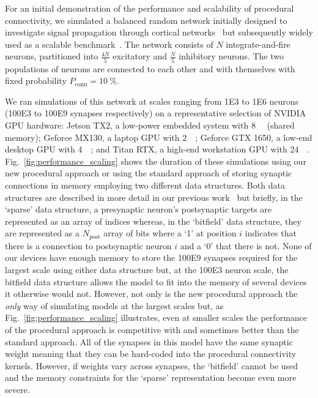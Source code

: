 \documentclass[9pt,a4paper]{amsart}
\begin{document}
For an initial demonstration of the performance and scalability of procedural connectivity, we simulated a balanced random network initially designed to investigate signal propagation through cortical networks~\citep{Vogels2005} but subsequently widely used as a scalable benchmark~\citep{Brette2007}.
The network consists of $N$ integrate-and-fire neurons, partitioned into $\frac{4N}{5}$ excitatory and $\frac{N}{5}$ inhibitory neurons.
The two populations of neurons are connected to each other and with themselves with fixed probability $P_{\text{conn}}=\SI{10}{\percent}$.

We ran simulations of this network at scales ranging from \num{1E3} to \num{1E6} neurons (\num{100E3} to \num{100E9} synapses respectively) on a representative selection of NVIDIA GPU hardware:
Jetson TX2, a low-power embedded system with \SI{8}{\giga\byte} (shared memory);
Geforce MX130, a laptop GPU with \SI{2}{\giga\byte};
Geforce GTX 1650, a low-end desktop GPU with \SI{4}{\giga\byte};
and Titan RTX, a high-end workstation GPU with \SI{24}{\giga\byte}.
Fig.~\ref{fig:performance_scaling} shows the duration of these simulations using our new procedural approach or using the standard approach of storing synaptic connections in memory employing two different data structures.
Both data structures are described in more detail in our previous work~\citep{Knight2018} but briefly, in the `sparse' data structure, a presynaptic neuron's postsynaptic targets are represented as an array of indices whereas, in the `bitfield' data structure, they are represented as a $N_{\text{post}}$ array of bits where a `1' at position $i$ indicates that there is a connection to postsynaptic neuron $i$ and a `0' that there is not.
None of our devices have enough memory to store the \num{100E9} synapses required for the largest scale using either data structure but, at the \num{100E3} neuron scale, the bitfield data structure allows the model to fit into the memory of several devices it otherwise would not.
However, not only is the new procedural approach the \emph{only} way of simulating models at the largest scales but, as Fig.~\ref{fig:performance_scaling} illustrates, even at smaller scales the performance of the procedural approach is competitive with and sometimes better than the standard approach.
All of the synapses in this model have the same synaptic weight meaning that they can be hard-coded into the procedural connectivity kernels.
However, if weights vary across synapses, the `bitfield' cannot be used and the memory constraints for the `sparse' representation become even more severe.
%
\end{document}

